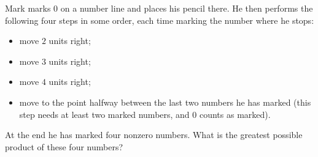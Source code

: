 Mark marks $0$ on a number line and places his pencil there. He then performs the following four steps in some order, each time marking the number where he stops:
\begin{itemize}
\item move $2$ units right; \item move $3$ units right; \item move $4$ units right;
\item move to the point halfway between the last two numbers he has marked (this step needs at least two marked numbers, and $0$ counts as marked).
\end{itemize}
At the end he has marked four nonzero numbers. What is the greatest possible product of these four numbers?

